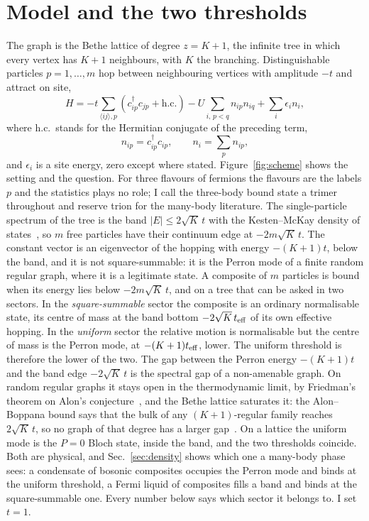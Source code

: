 \documentclass[aps,pre,twocolumn,superscriptaddress,floatfix]{revtex4-2}
\newcommand{\eps}{\epsilon}
\begin{document}
\section{Model and the two thresholds}
\label{sec:model}
The graph is the Bethe lattice of
degree $z=K+1$, the infinite tree in which every vertex has $K+1$
neighbours, with $K$ the branching. Distinguishable particles
$p=1,\dots,m$ hop between neighbouring vertices with amplitude $-t$ and
attract on site,
\begin{equation}
  H=-t\!\sum_{\langle ij\rangle,p}\!
  \left(c^{\dagger}_{ip}c_{jp}+\text{h.c.}\right)
  -U\sum_{i,\,p<q}n_{ip}n_{iq}
  +\sum_{i}\eps_{i}n_{i},
  \label{eq:H}
\end{equation}
where h.c.\ stands for the Hermitian conjugate of the preceding term,
\begin{equation}
  n_{ip}=c^{\dagger}_{ip}c_{ip},\qquad n_{i}=\sum_{p}n_{ip},
  \label{eq:n}
\end{equation}
and $\eps_{i}$ is a site energy, zero except where stated. Figure~\ref{fig:scheme}
shows the setting and the question. For three flavours of
fermions the flavours are the labels $p$ and the statistics plays no role;
I call the three-body bound state a trimer throughout and reserve trion for
the many-body literature. The single-particle spectrum of the tree is the
band $|E|\le2\sqrt{K}\,t$ with the Kesten--McKay density of
states~\cite{kesten1959,mckay1981}, so $m$ free particles have their
continuum edge at $-2m\sqrt{K}\,t$. The constant vector is an eigenvector
of the hopping with energy $-(K+1)t$, below the band, and it is not
square-summable: it is the Perron mode of a finite random regular graph,
where it is a legitimate state. A composite of $m$ particles is bound when
its energy lies below $-2m\sqrt{K}\,t$, and on a tree that can be asked in
two sectors. In the \emph{square-summable} sector the composite is an
ordinary normalisable state, its centre of mass at the band bottom
$-2\sqrt{K}\,t_{\rm eff}$ of its own effective hopping. In the
\emph{uniform} sector the relative motion is normalisable but the centre of
mass is the Perron mode, at $-(K+1)t_{\rm eff}$, lower. The uniform
threshold is therefore the lower of the two. The gap between the Perron
energy $-(K+1)t$ and the band edge $-2\sqrt{K}\,t$ is the spectral gap of a non-amenable graph. On random regular graphs
it stays open in the thermodynamic limit, by Friedman's theorem on
Alon's conjecture~\cite{friedman2008}, and the Bethe lattice saturates
it: the Alon--Boppana bound says that the bulk of any $(K+1)$-regular
family reaches $2\sqrt{K}\,t$, so no graph of that degree has a larger
gap~\cite{alon1986,nilli1991}. On a lattice the uniform mode is the $P=0$
Bloch state, inside the band, and the two thresholds coincide. Both are physical, and Sec.~\ref{sec:density}
shows which one a many-body phase sees: a condensate of bosonic
composites occupies the Perron mode and binds at the uniform threshold,
a Fermi liquid of composites fills a band and binds at the
square-summable one. Every number below says which sector it belongs to.
I set $t=1$.
\end{document}
